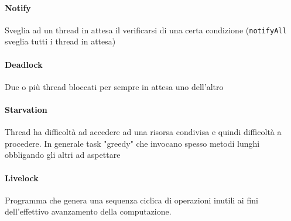 \documentclass[10pt]{article}
\begin{document}
\paragraph{Notify} Sveglia ad un thread in attesa il verificarsi di una certa condizione (\texttt{notifyAll} sveglia tutti i thread in attesa)
\paragraph{Deadlock} Due o più thread bloccati per sempre in attesa uno dell'altro
\paragraph{Starvation} Thread ha difficoltà ad accedere ad una risorsa condivisa e quindi difficoltà a procedere. In generale task "greedy" che invocano spesso metodi lunghi obbligando gli altri ad aspettare
\paragraph{Livelock} Programma che genera una sequenza ciclica di operazioni inutili ai fini dell'effettivo avanzamento della computazione.
\end{document}
